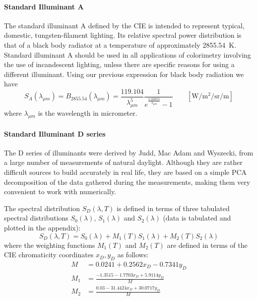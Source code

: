 \paragraph{Standard Illuminant A}

The standard illuminant A defined by the \gls{CIE} is intended to
represent typical, domestic, tungsten-filament lighting.
Its relative spectral power distribution is that of a black body radiator at a
temperature of approximately \SI{2855.54}{\kelvin}.
Standard illuminant A should be used in all applications of colorimetry
involving the use of incandescent lighting, unless there are specific reasons
for
using a different illuminant. Using our previous expression for black body radiation we have
\begin{equation}
S_{A}(\lambda_{\mu m}) = B_{2855.54}(\lambda_{\mu m}) =
\frac{119.104}{\lambda_{\mu m}^5} \frac 1{e^{\frac{5.03855}{\lambda_{\mu m}}}-1}
\qquad \left[\si{\watt\per\square\meter\per\steradian\per\meter}\right]
\end{equation}
where $\lambda_{\mu m}$ is the wavelength in micrometer.

\paragraph{Standard Illuminant D series}

The D series of illuminants were derived by Judd, Mac Adam and Wyszecki, from a
large number of measurements of natural daylight. Although they are rather
difficult sources to build accurately in real life, they are based on a simple
PCA decomposition of the data gathered during the measurements, making them
very convenient to work with numerically.

The spectral distribution $S_D(\lambda, T)$ is defined in terms of three tabulated spectral
distributions $S_0(\lambda)$, $S_1(\lambda)$ and $S_2(\lambda)$ (data is tabulated
and plotted in the appendix):
\begin{equation}
S_D(\lambda, T) = S_0(\lambda) + M_1(T) S_1(\lambda) + M_2(T) S_2(\lambda)
\end{equation}
where the weighting functions $M_1(T)$ and $M_2(T)$ are defined in terms of the
\gls{CIE} chromaticity coordinates $x_D, y_D$ as follows:
\begin{align*}
M   &= 0.0241 + 0.2562 x_D - 0.7341 y_D \\
M_1 &= \frac{-1.3515 - 1.7703 x_D + 5.9114 y_D}{M} \\
M_2 &= \frac{0.03 - 31.4424 x_D + 30.0717 y_D}{M} \\
\end{align*}

